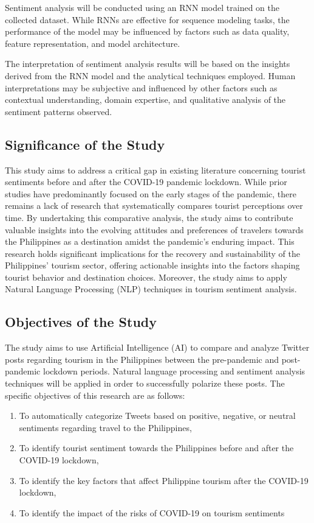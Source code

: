 \documentclass[journal]{./IEEE/IEEEtran}
\begin{document}
Sentiment analysis  will be conducted using an RNN model trained on the collected dataset. While RNNs are effective for sequence modeling tasks, the performance of the model may be influenced by factors such as data quality, feature representation, and model architecture.

The interpretation of sentiment analysis results will be based on the insights derived from the RNN model and the analytical techniques employed. Human interpretations may be subjective and influenced by other factors such as contextual understanding, domain expertise, and qualitative analysis of the sentiment patterns observed. 


\subsection{Significance of the Study}
This study aims to address a critical gap in existing literature concerning tourist sentiments before and after the COVID-19 pandemic lockdown. While prior studies have predominantly focused on the early stages of the pandemic, there remains a lack of research that systematically compares tourist perceptions over time. By undertaking this comparative analysis, the study aims to contribute valuable insights into the evolving attitudes and preferences of travelers towards the Philippines as a destination amidst the pandemic’s enduring impact. This research holds significant implications for the recovery and sustainability of the Philippines’ tourism sector, offering actionable insights into the factors shaping tourist behavior and destination choices. Moreover, the study aims to apply Natural Language Processing (NLP) techniques in tourism sentiment analysis.

\subsection{Objectives of the Study}
The study aims to use Artificial Intelligence (AI) to compare and analyze Twitter posts regarding tourism in the Philippines between the pre-pandemic and post-pandemic lockdown periods. Natural language processing and sentiment analysis techniques will be applied in order to successfully polarize these posts. The specific objectives of this research are as follows:

\begin{enumerate}
  \item\label{item:this} To automatically categorize Tweets based on positive, negative, or neutral sentiments regarding travel to the Philippines,
  \item\label{item:that} To identify tourist sentiment towards the Philippines before and after the COVID-19 lockdown,
  \item\label{item:these} To identify the key factors that affect Philippine tourism after the COVID-19 lockdown,
  \item \label{item:those} To identify the impact of the risks of COVID-19 on tourism sentiments
  \end{enumerate}
\end{document}
